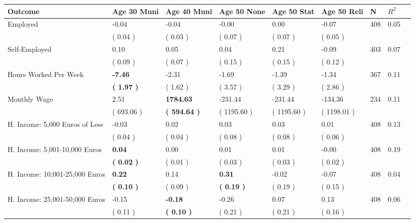 \begin{tabular}{L{6.2cm} C{1.8cm} C{1.8cm} C{1.8cm} C{1.8cm} C{1.8cm} C{1.8cm} C{0.3cm} C{0.3cm}}
\toprule
 \textbf{Outcome} & \textbf{Age 30 Muni} & \textbf{Age 40 Muni} & \textbf{Age 50 None} & \textbf{Age 50 Stat} & \textbf{Age 50 Reli} & \textbf{N} & \textbf{$ R^2$} \\
\midrule
Employed &     -0.04 &     -0.04 &     -0.00 &      0.00 &     -0.07  & 408 &       0.05 \\ 
 & (     0.04 ) & (     0.03 ) & (     0.07 ) & (     0.07 ) & (     0.05 )  & \\
Self-Employed &      0.10 &      0.05 &      0.04 &      0.21 &     -0.09  & 403 &       0.07 \\ 
 & (     0.09 ) & (     0.07 ) & (     0.15 ) & (     0.15 ) & (     0.12 )  & \\
Hours Worked Per Week & \textbf{    -7.46} &     -2.31 &     -1.69 &     -1.39 &     -1.34  & 367 &       0.11 \\ 
 & \textbf{(     1.97 )} & (     1.62 ) & (     3.57 ) & (     3.29 ) & (     2.86 )  & \\
Monthly Wage &      2.51 & \textbf{  1784.63} &   -231.44 &   -231.44 &   -134.36  & 234 &       0.11 \\ 
 & (   693.06 ) & \textbf{(   594.64 )} & (  1195.60 ) & (  1195.60 ) & (  1198.01 )  & \\
H. Income: 5,000 Euros of Less &     -0.03 &      0.02 &      0.03 &      0.03 &      0.01  & 408 &       0.13 \\ 
 & (     0.04 ) & (     0.04 ) & (     0.08 ) & (     0.08 ) & (     0.06 )  & \\
H. Income: 5,001-10,000 Euros & \textbf{     0.04} &      0.00 &      0.01 &      0.01 &     -0.00  & 408 &       0.19 \\ 
 & \textbf{(     0.02 )} & (     0.01 ) & (     0.03 ) & (     0.03 ) & (     0.02 )  & \\
H. Income: 10,001-25,000 Euros & \textbf{     0.22} &      0.14 & \textbf{     0.31} &     -0.02 &     -0.07  & 408 &       0.04 \\ 
 & \textbf{(     0.10 )} & (     0.09 ) & \textbf{(     0.19 )} & (     0.19 ) & (     0.15 )  & \\
H. Income: 25,001-50,000 Euros &     -0.15 & \textbf{    -0.18} &     -0.26 &      0.07 &      0.13  & 408 &       0.06 \\ 
 & (     0.11 ) & \textbf{(     0.10 )} & (     0.21 ) & (     0.21 ) & (     0.16 )  & \\

\end{tabular}
